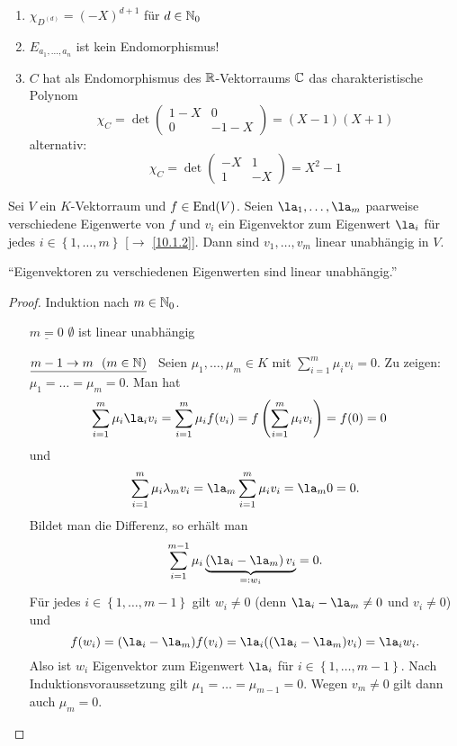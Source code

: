 \documentclass[../../main.tex]{subfiles}
\begin{document}
\begin{bsp}
\begin{enumerate}[\normalfont(a)]
\item $\chi_{D^{(d)}} = (-X)^{d+1}$ für $d\in \mathbb N_0$
\item $E_{a_1,\ldots,a_n}$ ist kein Endomorphismus!
\item $C$ hat als Endomorphismus des $\mathbb R$-Vektorraums $\mathbb C$ das charakteristische Polynom
$$\chi_C = \det\begin{pmatrix}
1-X & 0\\
0 & -1-X
\end{pmatrix} = (X-1)(X+1)$$
alternativ:
$$\chi_C = \det\begin{pmatrix}
-X & 1\\
1 & -X
\end{pmatrix} = X^2 - 1$$
\end{enumerate}
\end{bsp}

\begin{pro}\label{10.1.10}
Sei $V$ ein $K$-Vektorraum und $f\in \operatorname{End}(V)$. Seien $\la_1,\ldots,\la_m$ paarweise verschiedene Eigenwerte von $f$ und $v_i$ ein Eigenvektor zum Eigenwert $\la_i$ für jedes $i\in \left\{1,\ldots,m\right\}$ {\rm[$\to$ \ref{10.1.2}]}. Dann sind $v_1,\ldots,v_m$ linear unabhängig in $V$.

\smallskip
"`Eigenvektoren zu verschiedenen Eigenwerten sind linear unabhängig."'
\end{pro}
\begin{proof}
Induktion nach $m\in \mathbb N_0$.
\begin{itemize}
\item[$\underline{m = 0}$]\quad $\emptyset$ ist linear unabhängig \checkmark
\item[$\underline{m-1\to m\ \ (m\in \mathbb N)}$]\
Seien $\mu_1,\ldots,\mu_m\in K$ mit $\sum_{i = 1}^{m}\mu_iv_i = 0$. Zu zeigen: $\mu_1 = \ldots = \mu_m = 0$. Man hat
\begin{align*}
\sum_{i = 1}^{m}\mu_i\la_iv_i & = \sum_{i = 1}^{m}\mu_if(v_i) = f\left(\sum_{i = 1}^{m}\mu_i v_i\right) = f(0) = 0
\end{align*}
und
$$\sum_{i = 1}^{m}\mu_i \lambda_m v_i = \la_m\sum_{i = 1}^{m}\mu_i v_i = \la_m 0 = 0.$$
Bildet man die Differenz, so erhält man
$$\sum_{i = 1}^{m-1}\mu_i\underbrace{\left(\la_i - \la_m\right)v_i}_{=: w_i} = 0.$$
Für jedes $i\in \left\{1,\ldots,m-1\right\}$ gilt $w_i \ne 0$ (denn $\la_i - \la_m\ne 0$ und $v_i \ne 0$) und
\[f(w_i) = (\la_i-\la_m)f(v_i) = \la_i ((\la_i-\la_m)v_i) = \la_i w_i.\]
Also ist $w_i$ Eigenvektor zum Eigenwert $\la_i$ für $i\in \left\{1,\ldots,m-1\right\}$. Nach Induktionsvoraussetzung gilt $\mu_1 = \ldots = \mu_{m-1} = 0$. Wegen $v_m \ne 0$ gilt dann auch $\mu_m = 0$.
\end{itemize}
\end{proof}
\end{document}

